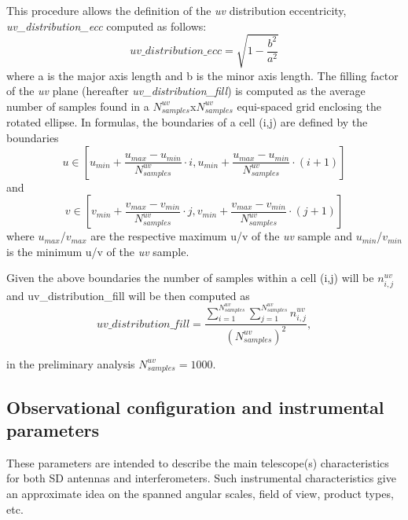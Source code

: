 \documentclass[11pt,a4paper]{ivoa}
\begin{document}
This procedure allows the definition of the \emph{uv} distribution eccentricity, \emph{uv\_distribution\_ecc} computed as follows:
\begin{equation}
uv\_distribution\_ecc = \sqrt{1-\frac{b^2}{a^2}}
\end{equation}
where a is the major axis length and b is the minor axis length.
The filling factor of the \emph{uv} plane (hereafter \emph{uv\_distribution\_fill}) is computed as the average
number of samples found in a $N^{uv}_{samples}$x$N^{uv}_{samples}$ equi-spaced grid enclosing the
rotated ellipse. In formulas, the boundaries of a cell (i,j) are defined by the boundaries
\begin{equation}
u \in [u_{min} + \frac{u_{max} - u_{min}}{N^{uv}_{samples}} \cdot i , u_{min} + \frac{u_{max} -
u_{min}}{N^{uv}_{samples}} \cdot (i + 1)]
\end{equation}
and
\begin{equation}
v \in [v_{min} + \frac{v_{max} - v_{min}}{N^{uv}_{samples}} \cdot j , v_{min} + \frac{v_{max} -
v_{min}}{N^{uv}_{samples}} \cdot (j + 1)]
\end{equation}
where $u_{max}$/$v_{max}$ are the respective maximum u/v of the \emph{uv} sample and
$u_{min}$/$v_{min}$ is the minimum u/v of the \emph{uv} sample.

Given the above boundaries the number of samples within a cell (i,j) will be $n^{uv}_{i,j}$
and uv\_distribution\_fill will be then computed as
\begin{equation}
uv\_distribution\_fill = \frac{\sum^{N^{uv}_{samples}}_{i=1} \sum^{N^{uv}_{samples}}_{j=1}
n^{uv}_{i,j} }{(N^{uv}_{samples}) ^ 2},
\end{equation}

in the preliminary analysis $N^{uv}_{samples} = 1000$.




\subsection{Observational configuration and instrumental parameters}
These parameters are intended to describe the main telescope(s) characteristics for both SD antennas and interferometers. 
Such instrumental characteristics give an approximate idea on the spanned angular scales, field of view, product types, etc.
\end{document}
